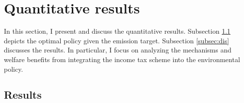 \section{Quantitative results}\label{sec:res}

In this section, I present and discuss the quantitative results.
Subsection \ref{subsec:mr} depicts the optimal policy given the emission target. Subsection \ref{subsec:dis} discusses the results. In particular, I focus on analyzing the mechanisms and welfare benefits from integrating the income tax scheme into the environmental policy. 

\subsection{Results}\label{subsec:mr}

